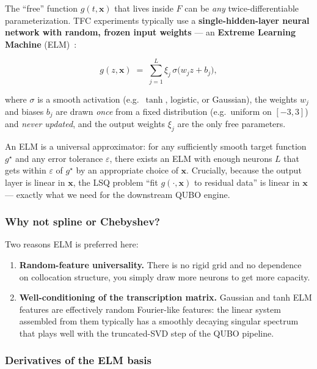 \documentclass[8pt,a4paper]{article}
\newcommand{\bvec}[1]{\bm{#1}}
\newcommand{\xvec}{\bvec{x}}
\theoremstyle{definition}
\theoremstyle{remark}
\begin{document}
The ``free'' function $g(t, \xvec)$ that lives inside $F$ can be
\emph{any} twice-differentiable parameterization. TFC experiments
typically use a \textbf{single-hidden-layer neural network with
random, frozen input weights} --- an \textbf{Extreme Learning Machine}
(ELM)~\cite{Huang2006}:

\begin{equation}
  g(z, \xvec) \;=\; \sum_{j=1}^{L} \xi_j \, \sigma\big( w_j z + b_j \big),
\end{equation}

where $\sigma$ is a smooth activation (e.g.\ $\tanh$, logistic, or
Gaussian), the weights $w_j$ and biases $b_j$ are drawn \emph{once}
from a fixed distribution (e.g.\ uniform on $[-3, 3]$) and \emph{never
updated}, and the output weights $\xi_j$ are the only free parameters.

An ELM is a universal approximator: for any sufficiently smooth
target function $g^\star$ and any error tolerance $\varepsilon$, there
exists an ELM with enough neurons $L$ that gets within $\varepsilon$
of $g^\star$ by an appropriate choice of $\xvec$. Crucially, because
the output layer is linear in $\xvec$, the LSQ problem ``fit
$g(\cdot, \xvec)$ to residual data'' is linear in $\xvec$ --- exactly
what we need for the downstream QUBO engine.

\subsubsection*{Why not spline or Chebyshev?}

Two reasons ELM is preferred here:

\begin{enumerate}[leftmargin=1.5em]
  \item \textbf{Random-feature universality.} There is no rigid grid
    and no dependence on collocation structure, you simply draw
    more neurons to get more capacity.
  \item \textbf{Well-conditioning of the transcription matrix.}
    Gaussian and tanh ELM features are effectively random Fourier-like
    features: the linear system assembled from them typically has a
    smoothly decaying singular spectrum that plays well with the
    truncated-SVD step of the QUBO pipeline.
\end{enumerate}

\subsubsection*{Derivatives of the ELM basis}
\end{document}
